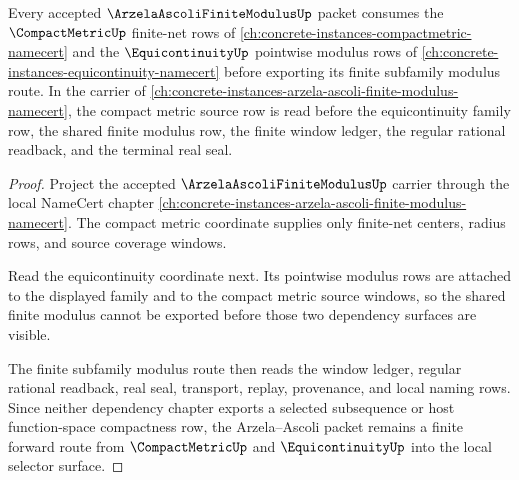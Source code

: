 \begin{theorem}
\label{thm:arzela-ascoli-finite-modulus-compactmetric-forward-route}
Every accepted $\ArzelaAscoliFiniteModulusUp$ packet consumes the $\CompactMetricUp$ finite-net rows of \autoref{ch:concrete-instances-compactmetric-namecert} and the $\EquicontinuityUp$ pointwise modulus rows of \autoref{ch:concrete-instances-equicontinuity-namecert} before exporting its finite subfamily modulus route. In the carrier of \autoref{ch:concrete-instances-arzela-ascoli-finite-modulus-namecert}, the compact metric source row is read before the equicontinuity family row, the shared finite modulus row, the finite window ledger, the regular rational readback, and the terminal real seal.
\end{theorem}
\begin{proof}
Project the accepted $\ArzelaAscoliFiniteModulusUp$ carrier through the local NameCert chapter \autoref{ch:concrete-instances-arzela-ascoli-finite-modulus-namecert}. The compact metric coordinate supplies only finite-net centers, radius rows, and source coverage windows.

Read the equicontinuity coordinate next. Its pointwise modulus rows are attached to the displayed family and to the compact metric source windows, so the shared finite modulus cannot be exported before those two dependency surfaces are visible.

The finite subfamily modulus route then reads the window ledger, regular rational readback, real seal, transport, replay, provenance, and local naming rows. Since neither dependency chapter exports a selected subsequence or host function-space compactness row, the Arzela--Ascoli packet remains a finite forward route from $\CompactMetricUp$ and $\EquicontinuityUp$ into the local selector surface.
\end{proof}
